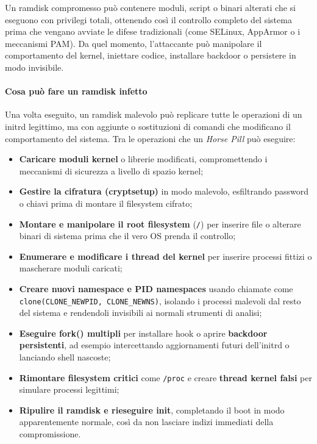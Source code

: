 Un ramdisk compromesso può contenere moduli, script o binari alterati che si eseguono con privilegi totali, ottenendo così il controllo completo del sistema prima che vengano avviate le difese tradizionali (come SELinux, AppArmor o i meccanismi PAM).
Da quel momento, l’attaccante può manipolare il comportamento del kernel, iniettare codice, installare backdoor o persistere in modo invisibile.

\paragraph{Cosa può fare un ramdisk infetto}
Una volta eseguito, un ramdisk malevolo può replicare tutte le operazioni di un initrd legittimo, ma con aggiunte o sostituzioni di comandi che modificano il comportamento del sistema.
Tra le operazioni che un \textit{Horse Pill} può eseguire:
\begin{itemize}
  \item \textbf{Caricare moduli kernel} o librerie modificati, compromettendo i meccanismi di sicurezza a livello di spazio kernel;
  \item \textbf{Gestire la cifratura (cryptsetup)} in modo malevolo, esfiltrando password o chiavi prima di montare il filesystem cifrato;
  \item \textbf{Montare e manipolare il root filesystem} (\texttt{/}) per inserire file o alterare binari di sistema prima che il vero OS prenda il controllo;
  \item \textbf{Enumerare e modificare i thread del kernel} per inserire processi fittizi o mascherare moduli caricati;
  \item \textbf{Creare nuovi namespace e PID namespaces} usando chiamate come \texttt{clone(CLONE\_NEWPID, CLONE\_NEWNS)}, isolando i processi malevoli dal resto del sistema e rendendoli invisibili ai normali strumenti di analisi;
  \item \textbf{Eseguire fork() multipli} per installare hook o aprire \textbf{backdoor persistenti}, ad esempio intercettando aggiornamenti futuri dell’initrd o lanciando shell nascoste;
  \item \textbf{Rimontare filesystem critici} come \texttt{/proc} e creare \textbf{thread kernel falsi} per simulare processi legittimi;
  \item \textbf{Ripulire il ramdisk e rieseguire init}, completando il boot in modo apparentemente normale, così da non lasciare indizi immediati della compromissione.
\end{itemize}

